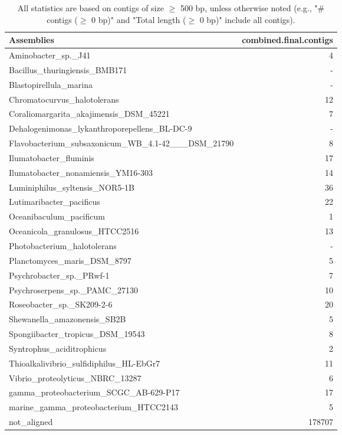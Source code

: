\documentclass[12pt,a4paper]{article}
\begin{document}
\begin{table}[ht]
\begin{center}
\caption{All statistics are based on contigs of size $\geq$ 500 bp, unless otherwise noted (e.g., "\# contigs ($\geq$ 0 bp)" and "Total length ($\geq$ 0 bp)" include all contigs).}
\begin{tabular}{|l*{1}{|r}|}
\hline
Assemblies & combined.final.contigs \\ \hline
Aminobacter\_sp.\_J41 & 4 \\ \hline
Bacillus\_thuringiensis\_BMB171 & - \\ \hline
Blastopirellula\_marina & - \\ \hline
Chromatocurvus\_halotolerans & 12 \\ \hline
Coraliomargarita\_akajimensis\_DSM\_45221 & 7 \\ \hline
Dehalogenimonas\_lykanthroporepellens\_BL-DC-9 & - \\ \hline
Flavobacterium\_subsaxonicum\_WB\_4.1-42\_\_\_DSM\_21790 & 8 \\ \hline
Ilumatobacter\_fluminis & 17 \\ \hline
Ilumatobacter\_nonamiensis\_YM16-303 & 14 \\ \hline
Luminiphilus\_syltensis\_NOR5-1B & 36 \\ \hline
Lutimaribacter\_pacificus & 22 \\ \hline
Oceanibaculum\_pacificum & 1 \\ \hline
Oceanicola\_granulosus\_HTCC2516 & 13 \\ \hline
Photobacterium\_halotolerans & - \\ \hline
Planctomyces\_maris\_DSM\_8797 & 5 \\ \hline
Psychrobacter\_sp.\_PRwf-1 & 7 \\ \hline
Psychroserpens\_sp.\_PAMC\_27130 & 10 \\ \hline
Roseobacter\_sp.\_SK209-2-6 & 20 \\ \hline
Shewanella\_amazonensis\_SB2B & 5 \\ \hline
Spongiibacter\_tropicus\_DSM\_19543 & 8 \\ \hline
Syntrophus\_aciditrophicus & 2 \\ \hline
Thioalkalivibrio\_sulfidiphilus\_HL-EbGr7 & 11 \\ \hline
Vibrio\_proteolyticus\_NBRC\_13287 & 6 \\ \hline
gamma\_proteobacterium\_SCGC\_AB-629-P17 & 17 \\ \hline
marine\_gamma\_proteobacterium\_HTCC2143 & 5 \\ \hline
not\_aligned & 178707 \\ \hline
\end{tabular}
\end{center}
\end{table}
\end{document}

